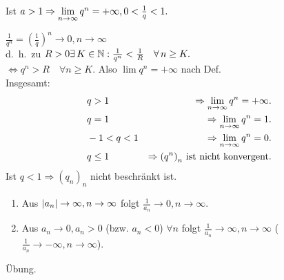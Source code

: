 \documentclass[../ana1.tex]{subfiles}
\begin{document}
\begin{bsp}
	Ist \(a>1 \Rightarrow \lim\limits_{n\rightarrow\infty}q^n = +\infty, 0< \frac{1}{q} < 1. \)
\end{bsp}
\begin{bew}
	\( \frac{1}{q^n} = {\left( \frac{1}{q} \right)}^n \rightarrow 0, n\rightarrow \infty \) \\
	d.\ h.\ zu \(R>0 \exists K\in\N: \frac{1}{q^n} < \frac{1}{R} \quad \forall n\geq K. \) \\
	\( \Leftrightarrow q^n > R \quad \forall n\geq K. \) Also \(\lim q^n = +\infty \) nach Def.\\
	Insgesamt:
	\begin{align*}
		&q>1 &\Rightarrow \lim\limits_{n\rightarrow\infty}q^n = +\infty.\\
		&q=1 &\Rightarrow \lim\limits_{n\rightarrow\infty}q^n = 1.\\
		&-1<q<1 & \Rightarrow \lim\limits_{n\rightarrow\infty} q^n = 0.\\
		&q\leq 1 & \Rightarrow {(q^n)}_n \text{ ist nicht konvergent.}
	\end{align*}
	Ist \( q<1 \Rightarrow {(q_n)}_n \) nicht beschränkt ist.
\end{bew}

\begin{satz}[Kehrwerte]\leavevmode
	\begin{enumerate}
		\item Aus \( \left|a_n\right| \rightarrow \infty, n\rightarrow\infty \) folgt \(\frac{1}{a_n} \rightarrow0,n\rightarrow\infty \).
		\item Aus \( a_n\rightarrow 0, a_n > 0 \) (bzw. \(a_n<0 \)) \( \forall n \) folgt \( \frac{1}{a_n} \rightarrow\infty, n\rightarrow\infty \) (\( \frac{1}{a_n} \rightarrow -\infty, n\rightarrow\infty \)).
	\end{enumerate}
\end{satz}
\begin{bew}
	Übung.\phantom{\qedhere}
\end{bew}
\end{document}
